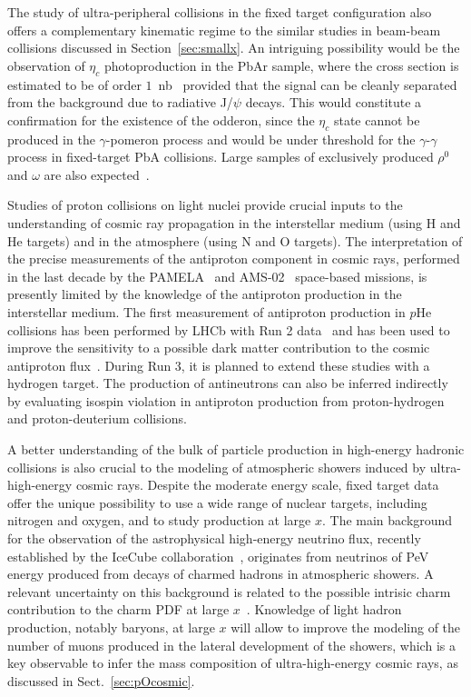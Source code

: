 \documentclass[../report.tex]{subfiles}
\begin{document}
The study of ultra-peripheral collisions in the fixed target
configuration also offers a complementary kinematic regime to
the similar studies in beam-beam collisions discussed in
Section~\ref{sec:smallx}. 
An intriguing possibility would be the observation of $\eta_c$ photoproduction in the PbAr sample, where the cross
section is estimated to be of order $1$~nb~\cite{Goncalves:2015hra} provided that the signal can be cleanly separated from the background due to radiative J/$\psi$ decays. This would constitute 
a confirmation for the existence of the odderon, since the $\eta_c$ state cannot be produced in the $\gamma$-pomeron 
process and would be under threshold for the $\gamma$-$\gamma$ process in fixed-target PbA collisions.
Large samples of exclusively produced $\rho^0$ and $\omega$ are also expected~\cite{Goncalves:2018htp}.


Studies of proton collisions on light nuclei provide crucial inputs to the
understanding of cosmic ray propagation in the interstellar medium
(using H and He targets) and in the atmosphere (using N and O
targets). The interpretation of the precise measurements of the
antiproton component in cosmic rays, performed in the last decade by the
PAMELA~\cite{Pamela} and AMS-02~\cite{AMS02} space-based missions, is
presently limited by the knowledge of the antiproton production
in the interstellar medium. The first measurement of antiproton production
in $p$He collisions has been performed by LHCb with Run 2
data~\cite{Aaij:2018svt} and has been used to improve the 
sensitivity to a possible dark matter contribution to the cosmic antiproton
flux~\cite{Reinert:2017aga,Korsmeier:2018gcy}. 
During Run 3, it is planned to extend these studies with a hydrogen
target. The production of antineutrons can also be inferred indirectly
by evaluating isospin violation in antiproton production 
from proton-hydrogen and proton-deuterium collisions.

A better understanding of the bulk of particle production in
high-energy hadronic collisions is also crucial to the modeling of
atmospheric showers induced by ultra-high-energy cosmic rays. 
Despite the moderate energy scale, fixed target data offer the
unique possibility to use a wide range of nuclear targets, including
nitrogen and oxygen, and to study production at large $x$. 
The main background for the observation of the astrophysical
high-energy neutrino flux, recently established by 
the IceCube collaboration~\cite{Aartsen:2013jdh}, originates from
neutrinos of PeV energy produced from decays of charmed hadrons in
atmospheric showers. A relevant uncertainty on this background
is related to the possible intrisic charm contribution to the charm
PDF at large $x$~\cite{Laha:2016dri}.  
Knowledge of light hadron production, notably baryons, at large $x$ will allow 
to improve the modeling of the number of muons produced in the lateral
development of the showers, which is a key observable to infer the
mass composition of ultra-high-energy cosmic rays, as discussed in Sect.~\ref{sec:pOcosmic}.
\end{document}

